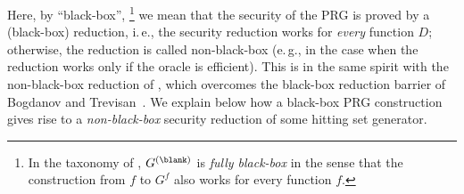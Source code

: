 \documentclass[11pt]{article}
\numberwithin{equation}{section}
\theoremstyle{definition}
\theoremstyle{plain}
\newcommand{\ie}{i.\,e.}
\newcommand{\eg}{e.\,g.}
\begin{document}
%
%
%
%
%
%
%
%
%
%
%
%
%
%
%
%
%
Here, by ``black-box'',%
\footnote{In the taxonomy of \cite{ReingoldTV04_tcc_conf}, $G^{(\blank)}$ is \emph{fully black-box}
  in the sense that the construction from $f$ to $G^f$ also works for every function $f$.}
we mean that the security of the PRG is proved by a (black-box) reduction, \ie,
the security reduction works for \emph{every} function $D$;
otherwise, the reduction is called non-black-box (\eg, in the case when the reduction works only if the oracle is efficient).
This is in the same spirit with the non-black-box reduction of \cite{Hirahara18_focs_conf},
which overcomes the black-box reduction barrier of Bogdanov and Trevisan~\cite{BogdanovT06_siamcomp_journals}.
We explain below how a black-box PRG construction gives rise to a \emph{non-black-box} security reduction of some
hitting set generator.

%
%
%
%
%
%
%
%
%
%
%
%
%
%
%
%
%
%
\end{document}

